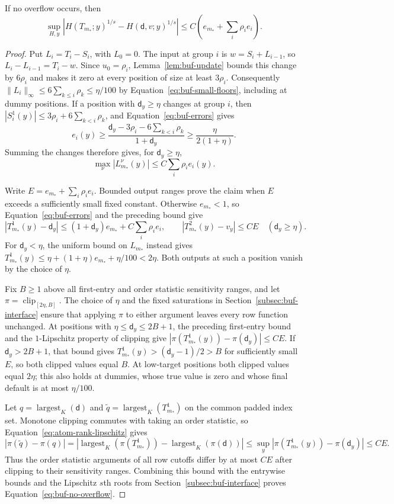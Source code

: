 If no overflow occurs, then
\begin{equation}
 \sup_{H,y}|H(T_{m_*};y)^{1/s}-H(\mathsf{d},v;y)^{1/s}|
       \leq C\left(e_{m_*}+\sum_i\rho_i e_i\right).
 \label{eq:buf-no-overflow}
\end{equation}
\begin{proof}
Put $L_i=T_i-S_i$, with $L_0=0$.  The input at group $i$ is
$w=S_i+L_{i-1}$, so $L_i-L_{i-1}=T_i-w$.  Since $u_0=\rho_i$,
Lemma~\ref{lem:buf-update} bounds this change by $6\rho_i$ and makes it
zero at every position of size at least $3\rho_i$.  Consequently
$\|L_i\|_\infty\leq6\sum_{k\leq i}\rho_k\leq\eta/100$ by
Equation~\eqref{eq:buf-small-floors}, including at dummy positions.
If a position with $\mathsf{d}_y\geq\eta$ changes at group $i$, then
$|S_i^1(y)|\leq3\rho_i+6\sum_{k<i}\rho_k$, and
Equation~\eqref{eq:buf-errors} gives
\[
 e_i(y)\geq
 \frac{\mathsf{d}_y-3\rho_i-6\sum_{k<i}\rho_k}{1+\mathsf{d}_y}
 \geq\frac{\eta}{2(1+\eta)}.
\]
Summing the changes therefore gives, for $\mathsf{d}_y\geq\eta$,
\[
 \max_\nu|L_{m_*}^\nu(y)|\leq C\sum_i\rho_i e_i(y).
\]

Write $E=e_{m_*}+\sum_i\rho_i e_i$.  Bounded output ranges prove the
claim when $E$ exceeds a sufficiently small fixed constant.  Otherwise
$e_{m_*}<1$, so Equation~\eqref{eq:buf-errors} and the preceding bound give
\[
 |T_{m_*}^1(y)-\mathsf{d}_y|
   \leq(1+\mathsf{d}_y)e_{m_*}+C\sum_i\rho_i e_i,
 \qquad |T_{m_*}^2(y)-v_y|\leq CE
 \quad(\mathsf{d}_y\geq\eta).
\]
For $\mathsf{d}_y<\eta$, the uniform bound on $L_{m_*}$ instead gives
$T_{m_*}^1(y)\leq\eta+(1+\eta)e_{m_*}+\eta/100<2\eta$.
Both outputs at such a position vanish by the choice of $\eta$.

Fix $B\geq1$ above all first-entry and order statistic sensitivity ranges,
and let $\pi=\operatorname{clip}_{[2\eta,B]}$.  The choice of $\eta$ and
the fixed saturations in Section~\ref{subsec:buf-interface} ensure that
applying $\pi$ to either argument leaves every row function unchanged.
At positions with $\eta\leq\mathsf{d}_y\leq2B+1$, the preceding
first-entry bound and the $1$-Lipschitz property of clipping give
$|\pi(T_{m_*}^1(y))-\pi(\mathsf{d}_y)|\leq CE$.
If $\mathsf{d}_y>2B+1$, that bound gives
$T_{m_*}^1(y)>(\mathsf{d}_y-1)/2>B$ for sufficiently small $E$,
so both clipped values equal $B$.  At low-target positions both clipped
values equal $2\eta$; this also holds at dummies, whose true value is zero
and whose final default is at most $\eta/100$.

Let $q=\operatorname{largest}_K(\mathsf{d})$ and
$\widetilde q=\operatorname{largest}_K(T_{m_*}^1)$ on the common padded
index set.  Monotone clipping commutes with taking an order statistic,
so Equation~\eqref{eq:atom-rank-lipschitz} gives
\[
 |\pi(\widetilde q)-\pi(q)|
 =|\operatorname{largest}_K(\pi(T_{m_*}^1))
       -\operatorname{largest}_K(\pi(\mathsf{d}))|
 \leq\sup_y|\pi(T_{m_*}^1(y))-\pi(\mathsf{d}_y)|\leq CE.
\]
Thus the order statistic arguments of all row cutoffs differ by at most
$CE$ after clipping to their sensitivity ranges.  Combining this bound
with the entrywise bounds and the Lipschitz $s$th roots from
Section~\ref{subsec:buf-interface} proves Equation~\eqref{eq:buf-no-overflow}.
\end{proof}

